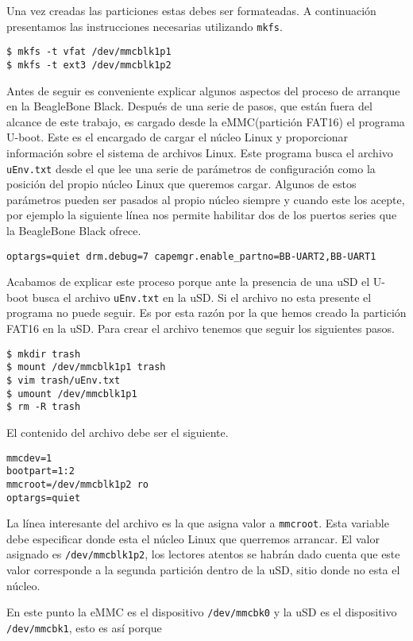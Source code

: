		Una vez creadas las particiones estas debes ser formateadas. A continuación presentamos las instrucciones necesarias utilizando
		\texttt{mkfs}.
		\begin{lstlisting}[style=myBash]
$ mkfs -t vfat /dev/mmcblk1p1
$ mkfs -t ext3 /dev/mmcblk1p2
		\end{lstlisting}
		Antes de seguir es conveniente explicar algunos aspectos del proceso de arranque en la BeagleBone Black. Después de una serie de
		pasos, que están fuera del alcance de este trabajo, es cargado desde la eMMC(partición FAT16) el programa U-boot. Este es el encargado
		de cargar el núcleo Linux y proporcionar información sobre el sistema de archivos Linux. Este programa busca el archivo
		\texttt{uEnv.txt} desde el que lee una serie de parámetros de configuración como la posición del propio núcleo Linux que queremos
		cargar. Algunos de estos parámetros pueden ser pasados al propio núcleo siempre y cuando este los acepte, por ejemplo la siguiente
		línea nos permite habilitar dos de los puertos series que la BeagleBone Black ofrece.
		\begin{lstlisting}[style=myFile]
optargs=quiet drm.debug=7 capemgr.enable_partno=BB-UART2,BB-UART1
		\end{lstlisting}
		Acabamos de explicar este proceso porque ante la presencia de una uSD el U-boot busca el archivo \texttt{uEnv.txt} en la uSD. Si el
		archivo no esta presente el programa no puede seguir. Es por esta razón por la que hemos creado la partición FAT16 en la uSD. Para
		crear el archivo tenemos que seguir los siguientes pasos.
		\begin{lstlisting}[style=myBash]
$ mkdir trash
$ mount /dev/mmcblk1p1 trash
$ vim trash/uEnv.txt
$ umount /dev/mmcblk1p1
$ rm -R trash
		\end{lstlisting}
		El contenido del archivo debe ser el siguiente.
		\begin{lstlisting}[style=myFile]
mmcdev=1
bootpart=1:2
mmcroot=/dev/mmcblk1p2 ro
optargs=quiet 
		\end{lstlisting}
		La línea interesante del archivo es la que asigna valor a \texttt{mmcroot}. Esta variable debe especificar donde esta el núcleo Linux
		que querremos arrancar. El valor asignado es \texttt{/dev/mmcblk1p2}, los lectores atentos se habrán dado cuenta que este valor
		corresponde a la segunda partición dentro de la uSD, sitio donde no esta el núcleo.
		\par 
		En este punto la eMMC es el dispositivo \texttt{/dev/mmcbk0} y la uSD es el dispositivo \texttt{/dev/mmcbk1}, esto es así porque
